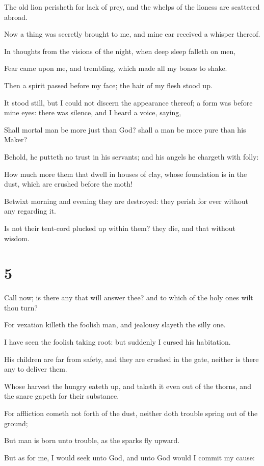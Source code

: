 \documentclass[12pt,oneside]{book}
\begin{document}
The old lion perisheth for lack of prey, and the whelps of the lioness are scattered abroad.

Now a thing was secretly brought to me, and mine ear received a whisper thereof.

In thoughts from the visions of the night, when deep sleep falleth on men,

Fear came upon me, and trembling, which made all my bones to shake.

Then a spirit passed before my face; the hair of my flesh stood up.

It stood still, but I could not discern the appearance thereof; a form was before mine eyes: there was silence, and I heard a voice, saying,

Shall mortal man be more just than God? shall a man be more pure than his Maker?

Behold, he putteth no trust in his servants; and his angels he chargeth with folly:

How much more them that dwell in houses of clay, whose foundation is in the dust, which are crushed before the moth!

Betwixt morning and evening they are destroyed: they perish for ever without any regarding it.

Is not their tent-cord plucked up within them? they die, and that without wisdom.


\chapter{5}
Call now; is there any that will answer thee? and to which of the holy ones wilt thou turn?

For vexation killeth the foolish man, and jealousy slayeth the silly one.

I have seen the foolish taking root: but suddenly I cursed his habitation.

His children are far from safety, and they are crushed in the gate, neither is there any to deliver them.

Whose harvest the hungry eateth up, and taketh it even out of the thorns, and the snare gapeth for their substance.

For affliction cometh not forth of the dust, neither doth trouble spring out of the ground;

But man is born unto trouble, as the sparks fly upward.

But as for me, I would seek unto God, and unto God would I commit my cause:
\end{document}
